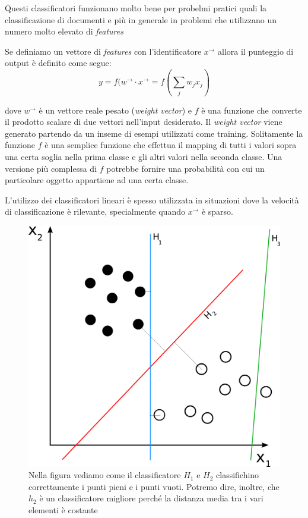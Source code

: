 \documentclass[a4paper,12pt,openright,twoside]{report}
\theoremstyle{definition}
\begin{document}
Questi classificatori funzionano molto bene per probelmi pratici quali la classificazione di 
documenti e più in generale in problemi che utilizzano un numero molto elevato di \emph{features}

Se definiamo un vettore di \emph{features} con l'identificatore $x^\rightarrow$ allora il punteggio di output
è definito come segue:
\begin{equation}
	y=f(w^\rightarrow \cdot x^\rightarrow = f (\sum_j w_jx_j)
	\label{output score}
\end{equation}

dove $w^\rightarrow$ è un vettore reale pesato (\emph{weight vector}) e $f$ è una 
funzione che converte il prodotto scalare di due vettori nell'input desiderato.
Il \emph{weight vector} viene generato partendo da un inseme di esempi utilizzati come training. Solitamente
la funzione $f$ è una semplice funzione
che effettua il mapping di tutti i valori sopra una certa soglia nella prima classe e gli altri valori nella
seconda classe. Una versione più complessa di $f$ potrebbe fornire una probabilità con cui un particolare
oggetto appartiene ad una certa classe.

L'utilizzo dei classificatori lineari è spesso utilizzata in situazioni dove la velocità di classificazione
è rilevante, specialmente quando $x^\rightarrow$ è sparso.
\begin{figure}[h]
	\centering
	\includegraphics[scale=0.2]{Immagini/liblinear_esempio.png}
	\caption{Nella figura vediamo come il classificatore $H_1$ e $H_2$ classifichino
	correttamente i punti pieni e i punti vuoti. Potremo dire, inoltre, che $h_2$
	è un classificatore migliore perché la distanza media tra i vari elementi è costante}
	\label{fig:liblinearEx}
\end{figure}
\end{document}

